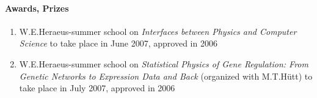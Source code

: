 \paragraph{Awards, Prizes}
\begin{enumerate}
\item W.E.Heraeus-summer school on {\it Interfaces between Physics
and Computer Science} to take place in June 2007, approved in 2006
\item W.E.Heraeus-summer school on {\it Statistical Physics of
Gene Regulation: From Genetic Networks to Expression Data and Back
} (organized with M.T.H\"utt) to take place in July 2007, approved in 2006
\end{enumerate}

\nocite{ortmanns0}
\nocite{ortmanns5}
\nocite{ortmanns6}
\nocite{meyerortmanns1}
\nocite{vilone1}
